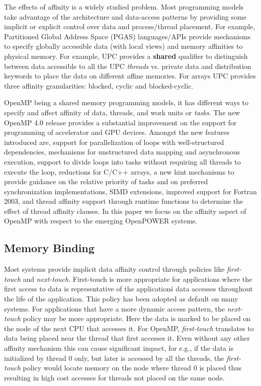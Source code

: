 The effects of affinity is a widely studied problem. Most programming models 
take advantage of the architecture and data-access patterns by providing some 
implicit or explicit control over data and process/thread placement. For example,
Partitioned Global Address Space (PGAS) languages/APIs provide mechanisms to specify 
globally accessible data (with local views) and memory affinities to physical memory. 
For example, UPC provides a \textbf{shared} qualifier to distinguish between data 
accessible to all the UPC \textit{threads} vs. private data and distribution keywords to place
the data on different affine memories. For arrays UPC provides 
three affinity granularities: blocked, cyclic and blocked-cyclic. 

OpenMP being a shared memory programming models, it has 
different ways to specify and affect affinity of data, threads, and work units or \textit{tasks}. 
The new OpenMP 4.0 release provides a substantial 
improvement on the support for programming of accelerator and GPU devices. 
Amongst the new features introduced are, support for parallelization of loops with 
well-structured dependencies, mechanisms for unstructured data mapping and 
asynchronous execution, support to divide loops into tasks without requiring all 
threads to execute the loop, reductions for C/C++ arrays, a new hint mechanisms to 
provide guidance on the relative priority of tasks and on preferred synchronization 
implementations, SIMD extensions, improved support for Fortran 2003, and
thread affinity support through runtime functions to determine the effect of thread 
affinity clauses. In this paper we focus on the affinity aspect of OpenMP with respect 
to the emerging OpenPOWER systems.

\subsection{Memory Binding}
Most systems provide implicit data affinity control through policies like \textit{first-touch} 
and \textit{next-touch}. First-touch is more appropriate for applications where the 
first access to data is representative of the application\'s data accesses throughout 
the life of the application. This policy has been adopted as default on many systems. 
For applications that have a more dynamic access pattern, the \textit{next-touch} 
policy may be more appropriate. Here the data is marked to be placed on the node of the 
next CPU that accesses it. For OpenMP, \textit{first-touch} translates to data being 
placed near the thread that first accesses it. Even without any other affinity mechanism this 
can cause significant impact, for e.g., if the data is initialized by thread 0 only, but later is accessed 
by all the threads, the \textit{first-touch} policy would locate memory on the node where 
thread 0 is placed thus resulting in high cost accesses for threads not placed on the same node. 

